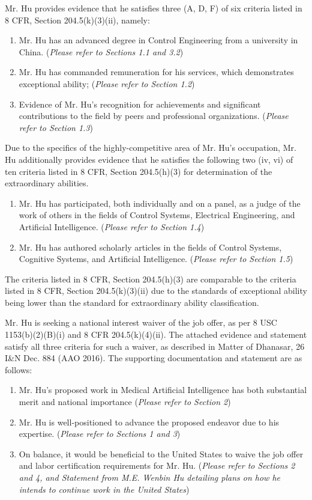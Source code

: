 \documentclass{article}
\begin{document}
Mr. Hu provides evidence that he satisfies three (A, D, F) of six criteria listed in 8 CFR, Section 204.5(k)(3)(ii), namely:
\begin{enumerate}
    \item Mr. Hu has an advanced degree in Control Engineering from a university in China. ({\it Please refer to Sections 1.1 and 3.2})
    \item Mr. Hu has commanded remuneration for his services, which demonstrates exceptional ability; ({\it Please refer to Section 1.2})
    \item Evidence of Mr. Hu's recognition for achievements and significant contributions to the field by peers and professional organizations. ({\it Please refer to Section 1.3})
\end{enumerate}
Due to the specifics of the highly-competitive area of Mr. Hu's occupation, Mr. Hu additionally provides evidence that he satisfies the following two (iv, vi) of ten criteria listed in 8 CFR, Section 204.5(h)(3) for determination of the extraordinary abilities. 
\begin{enumerate}
    \item Mr. Hu has participated, both individually and on a panel, as a judge of the work of others in the fields of Control Systems, Electrical Engineering, and Artificial Intelligence. ({\it Please refer to Section 1.4})
    \item Mr. Hu has authored scholarly articles in the fields of Control Systems, Cognitive Systems, and Artificial Intelligence. ({\it Please refer to Section 1.5})
\end{enumerate}

The criteria listed in 8 CFR, Section 204.5(h)(3) are comparable to the criteria listed in 8 CFR, Section 204.5(k)(3)(ii) due to the standards of exceptional ability being lower than the standard for extraordinary ability classification.

Mr. Hu is seeking a national interest waiver of the job offer, as per 8 USC 1153(b)(2)(B)(i) and 8 CFR  204.5(k)(4)(ii). The attached evidence and statement satisfy all three criteria for such a waiver, as described in Matter of Dhanasar, 26 I\&N Dec. 884 (AAO 2016). The supporting documentation and statement are as follows:

\begin{enumerate}
    \item Mr. Hu’s proposed work in Medical Artificial Intelligence has both substantial merit and national importance ({\it Please refer to Section 2})
    \item Mr. Hu is well-positioned to advance the proposed endeavor due to his expertise. ({\it Please refer to Sections 1 and 3})
    \item On balance, it would be beneficial to the United States to waive the job offer and labor certification requirements for Mr. Hu. ({\it Please refer to Sections 2 and 4, and Statement from M.E. Wenbin Hu detailing plans on how he intends to continue work in the United States})
\end{enumerate}
\end{document}
